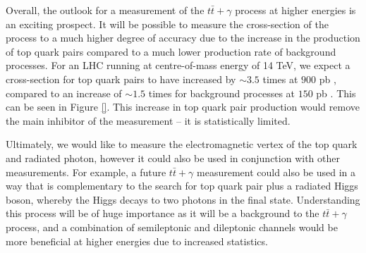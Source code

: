Overall, the outlook for a measurement of the $t\bar{t}+\gamma$ process at higher energies is an exciting prospect. It will be possible to measure the cross-section of the process to a much higher degree of accuracy due to the increase in the production of top quark pairs compared to a much lower production rate of background processes. For an LHC running at centre-of-mass energy of 14 TeV, we expect a cross-section for top quark pairs to have increased by $\sim3.5$ times at $900$ pb \cite{}, compared to an increase of $\sim1.5$ times for background processes at $150$ pb \cite{}. This can be seen in Figure \ref{}. This increase in top quark pair production would remove the main inhibitor of the measurement -- it is statistically limited.

Ultimately, we would like to measure the electromagnetic vertex of the top quark and radiated photon, however it could also be used in conjunction with other measurements. For example, a future $t\bar{t}+\gamma$ measurement could also be used in a way that is complementary to the search for top quark pair plus a radiated Higgs boson, whereby the Higgs decays to two photons in the final state. Understanding this process will be of huge importance as it will be a background to the $t\bar{t}+\gamma$ process, and a combination of semileptonic and dileptonic channels would be more beneficial at higher energies due to increased statistics. 
